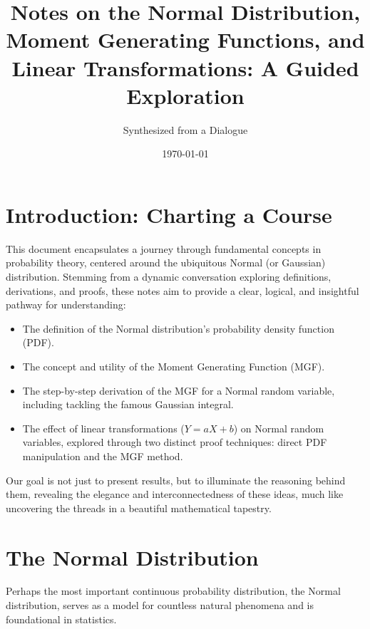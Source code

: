 \documentclass[11pt, letterpaper]{article}
\theoremstyle{definition}
\theoremstyle{remark}
\begin{document}
\title{Notes on the Normal Distribution, Moment Generating Functions, and Linear Transformations: A Guided Exploration}
\author{Synthesized from a Dialogue} 
\date{\today} %
\maketitle

\tableofcontents
\newpage

\section{Introduction: Charting a Course}

This document encapsulates a journey through fundamental concepts in probability theory, centered around the ubiquitous Normal (or Gaussian) distribution. Stemming from a dynamic conversation exploring definitions, derivations, and proofs, these notes aim to provide a clear, logical, and insightful pathway for understanding:

\begin{itemize}
    \item The definition of the Normal distribution's probability density function (PDF).
    \item The concept and utility of the Moment Generating Function (MGF).
    \item The step-by-step derivation of the MGF for a Normal random variable, including tackling the famous Gaussian integral.
    \item The effect of linear transformations ($Y=aX+b$) on Normal random variables, explored through two distinct proof techniques: direct PDF manipulation and the MGF method.
\end{itemize}

Our goal is not just to present results, but to illuminate the reasoning behind them, revealing the elegance and interconnectedness of these ideas, much like uncovering the threads in a beautiful mathematical tapestry.

\section{The Normal Distribution}

Perhaps the most important continuous probability distribution, the Normal distribution, serves as a model for countless natural phenomena and is foundational in statistics.
\end{document}
